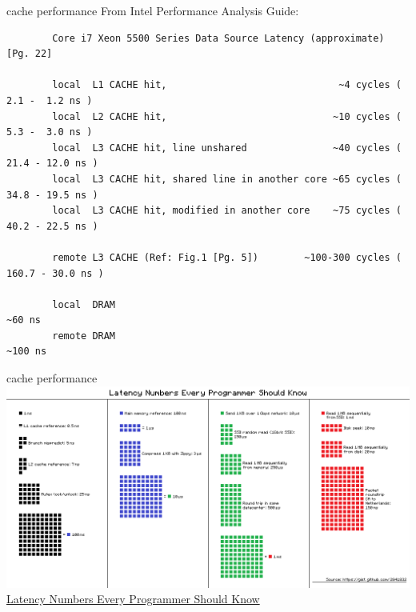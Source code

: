 \documentclass[10pt, t]{beamer}
\begin{document}
  \begin{frame}[fragile]{cache performance}
    From Intel Performance Analysis Guide:
    \begin{tiny}
      \begin{verbatim}
        Core i7 Xeon 5500 Series Data Source Latency (approximate)               [Pg. 22]

        local  L1 CACHE hit,                              ~4 cycles (   2.1 -  1.2 ns )
        local  L2 CACHE hit,                             ~10 cycles (   5.3 -  3.0 ns )
        local  L3 CACHE hit, line unshared               ~40 cycles (  21.4 - 12.0 ns )
        local  L3 CACHE hit, shared line in another core ~65 cycles (  34.8 - 19.5 ns )
        local  L3 CACHE hit, modified in another core    ~75 cycles (  40.2 - 22.5 ns )

        remote L3 CACHE (Ref: Fig.1 [Pg. 5])        ~100-300 cycles ( 160.7 - 30.0 ns )

        local  DRAM                                                   ~60 ns
        remote DRAM                                                  ~100 ns
      \end{verbatim}
    \end{tiny}
  \end{frame}

  \begin{frame}{cache performance}
    \includegraphics[width=\textwidth]{cache-perf.png}\\
    \hfill \tiny{\href{https://i.stack.imgur.com/a7jWu.png}{Latency Numbers
    Every Programmer Should Know}}
  \end{frame}
\end{document}
